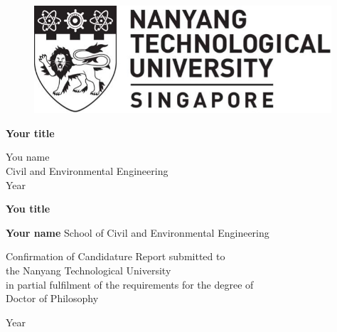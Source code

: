 \begin{titlepage}
   \begin{center}
    \vspace{-1.8in}    
    \begin{figure}
        \centering
        \includegraphics[height=4cm]{pre_figure/ntu_logo_bw.jpg}
    \end{figure}     
    \vspace*{2.5cm}
    \begin{spacing}{2}
    {\fontsize{18pt}{18pt}\selectfont \textmd{\textbf{Your title}}}
    \end{spacing}
       \vspace*{8.5cm}
    \begin{spacing}{2}
       {\fontsize{14pt}{14pt}\selectfont \textmd{You name\\}}
       {\fontsize{14pt}{14pt}\selectfont \textmd{Civil and Environmental Engineering\\}}
       {\fontsize{14pt}{14pt}\selectfont \textmd{Year}}\\
    \end{spacing}     
   \end{center}
\end{titlepage}
\clearpage
\thispagestyle{empty}
\mbox{} 
\newpage
\thispagestyle{empty} 
\begin{center}
\begin{spacing}{2}
    {\fontsize{18pt}{18pt}\selectfont \textmd{\textbf{You title}}}
\end{spacing}
    \vspace*{6cm}
    {\fontsize{14pt}{14pt}\selectfont \textmd{\textbf{Your name}}}
    \vspace*{7.5cm}
    {\fontsize{14pt}{14pt}\selectfont \textmd{School of Civil and Environmental Engineering}}
    \vspace*{1.5cm}  
\begin{spacing}{1.5}
\normalsize
    Confirmation of Candidature Report submitted to \\
the Nanyang Technological University\\
in partial fulfilment of the requirements for the degree of \\
Doctor of Philosophy 
\end{spacing}
\vspace*{1.5cm}
{\fontsize{14pt}{14pt}\selectfont \textmd{Year}}
\end{center}
